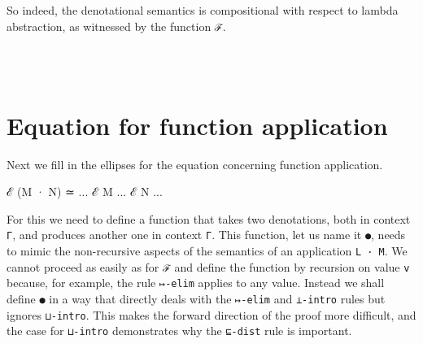 So indeed, the denotational semantics is compositional with respect to
lambda abstraction, as witnessed by the function \texttt{ℱ}.

\begin{fence}
\begin{code}%
\>[0]\AgdaSpace{}%
\AgdaSymbol{:}\AgdaSpace{}%
\AgdaSymbol{\}\{}\AgdaSpace{}%
\AgdaSymbol{:}\AgdaSpace{}%
\AgdaSpace{}%
\AgdaOperator{\AgdaInductiveConstructor{,}}\AgdaSpace{}%
\AgdaSpace{}%
\AgdaSpace{}%
\AgdaSymbol{\}}\<%
\\
\>[0][@{}l@{\AgdaIndent{0}}]%
\>[2]\AgdaSpace{}%
\AgdaSpace{}%
\AgdaSymbol{(}\AgdaSpace{}%
\AgdaSymbol{)}\AgdaSpace{}%
\AgdaSpace{}%
\AgdaSpace{}%
\AgdaSymbol{(}\AgdaSpace{}%
\AgdaSymbol{)}\<%
\\
\>[0]\AgdaSpace{}%
\AgdaSpace{}%
\AgdaSpace{}%
\AgdaSymbol{=}\AgdaSpace{}%
\AgdaSpace{}%
\AgdaSpace{}%
\AgdaOperator{\AgdaInductiveConstructor{,}}\AgdaSpace{}%
\AgdaSpace{}%
\<%
\end{code}
\end{fence}

\hypertarget{equation-for-function-application}{%
\section{Equation for function
application}\label{equation-for-function-application}}

Next we fill in the ellipses for the equation concerning function
application.

\begin{myDisplay}
ℰ (M · N) ≃ ... ℰ M ... ℰ N ...
\end{myDisplay}

For this we need to define a function that takes two denotations, both
in context \texttt{Γ}, and produces another one in context \texttt{Γ}.
This function, let us name it \texttt{●}, needs to mimic the
non-recursive aspects of the semantics of an application
\texttt{L\ ·\ M}. We cannot proceed as easily as for \texttt{ℱ} and
define the function by recursion on value \texttt{v} because, for
example, the rule \texttt{↦-elim} applies to any value. Instead we shall
define \texttt{●} in a way that directly deals with the \texttt{↦-elim}
and \texttt{⊥-intro} rules but ignores \texttt{⊔-intro}. This makes the
forward direction of the proof more difficult, and the case for
\texttt{⊔-intro} demonstrates why the \texttt{⊑-dist} rule is important.

